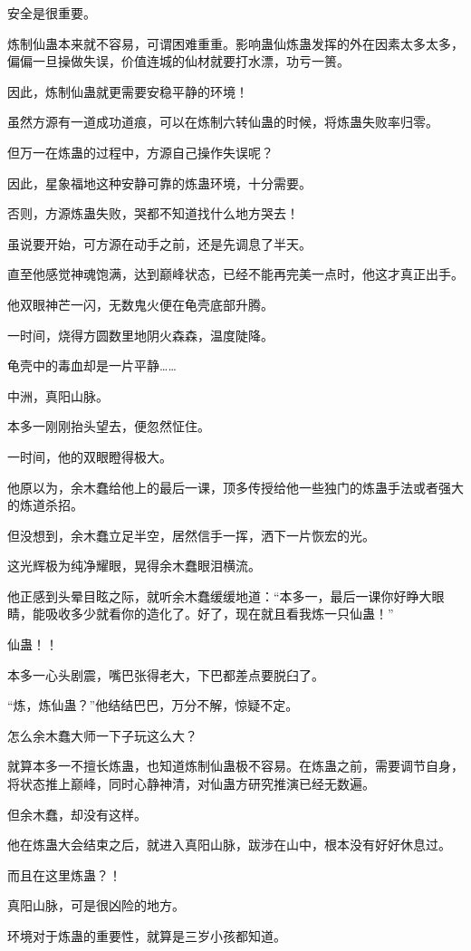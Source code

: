 \begin{this_body}
安全是很重要。

炼制仙蛊本来就不容易，可谓困难重重。影响蛊仙炼蛊发挥的外在因素太多太多，偏偏一旦操做失误，价值连城的仙材就要打水漂，功亏一篑。

因此，炼制仙蛊就更需要安稳平静的环境！

虽然方源有一道成功道痕，可以在炼制六转仙蛊的时候，将炼蛊失败率归零。

但万一在炼蛊的过程中，方源自己操作失误呢？

因此，星象福地这种安静可靠的炼蛊环境，十分需要。

否则，方源炼蛊失败，哭都不知道找什么地方哭去！

虽说要开始，可方源在动手之前，还是先调息了半天。

直至他感觉神魂饱满，达到巅峰状态，已经不能再完美一点时，他这才真正出手。

他双眼神芒一闪，无数鬼火便在龟壳底部升腾。

一时间，烧得方圆数里地阴火森森，温度陡降。

龟壳中的毒血却是一片平静……

中洲，真阳山脉。

本多一刚刚抬头望去，便忽然怔住。

一时间，他的双眼瞪得极大。

他原以为，余木蠢给他上的最后一课，顶多传授给他一些独门的炼蛊手法或者强大的炼道杀招。

但没想到，余木蠢立足半空，居然信手一挥，洒下一片恢宏的光。

这光辉极为纯净耀眼，晃得余木蠢眼泪横流。

他正感到头晕目眩之际，就听余木蠢缓缓地道：“本多一，最后一课你好睁大眼睛，能吸收多少就看你的造化了。好了，现在就且看我炼一只仙蛊！”

仙蛊！！

本多一心头剧震，嘴巴张得老大，下巴都差点要脱臼了。

“炼，炼仙蛊？”他结结巴巴，万分不解，惊疑不定。

怎么余木蠢大师一下子玩这么大？

就算本多一不擅长炼蛊，也知道炼制仙蛊极不容易。在炼蛊之前，需要调节自身，将状态推上巅峰，同时心静神清，对仙蛊方研究推演已经无数遍。

但余木蠢，却没有这样。

他在炼蛊大会结束之后，就进入真阳山脉，跋涉在山中，根本没有好好休息过。

而且在这里炼蛊？！

真阳山脉，可是很凶险的地方。

环境对于炼蛊的重要性，就算是三岁小孩都知道。


\end{this_body}
